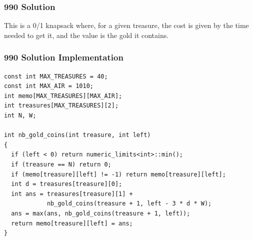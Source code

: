 \documentclass{beamer}
\newcommand{\uvalink}[2]{UVa Online Judge (http://uva.onlinejudge.org)
  problem number \href{#2}{\textcolor{blue}{#1}.}}
\newcounter{exo}
\newcommand{\exo}{
  \addtocounter{exo}{1}
  Exercice \arabic{exo}
}
\begin{document}

\ifanswers

\begin{frame}%
\frametitle{990 Solution}

\footnotesize

This is a 0/1 knapsack where, for a given treasure, the cost is given by the time needed to get it, and the
value is the gold it contains.


\end{frame}

\begin{frame}[containsverbatim]
\frametitle{990 Solution Implementation}
\scriptsize

\begin{lstlisting}
const int MAX_TREASURES = 40;
const int MAX_AIR = 1010;
int memo[MAX_TREASURES][MAX_AIR];
int treasures[MAX_TREASURES][2];
int N, W;

int nb_gold_coins(int treasure, int left)
{
  if (left < 0) return numeric_limits<int>::min();
  if (treasure == N) return 0;
  if (memo[treasure][left] != -1) return memo[treasure][left];
  int d = treasures[treasure][0];
  int ans = treasures[treasure][1] +
            nb_gold_coins(treasure + 1, left - 3 * d * W);
  ans = max(ans, nb_gold_coins(treasure + 1, left));
  return memo[treasure][left] = ans;
}
\end{lstlisting}

\end{frame}
\end{document}

